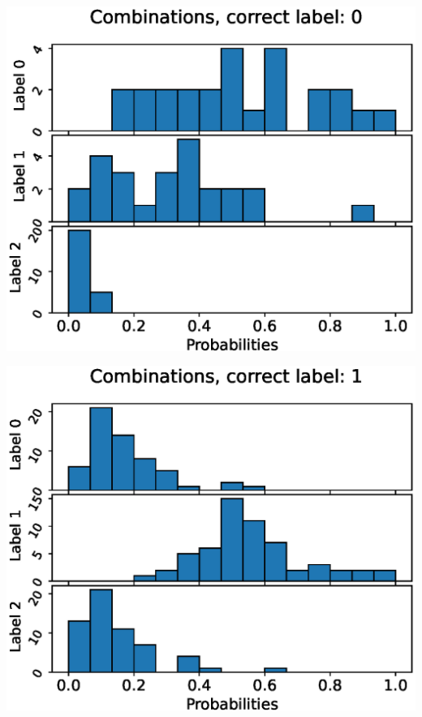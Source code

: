 \begin{center}
\begin{minipage}{0.33\textwidth}
  \includegraphics[width=\textwidth]{files/figs/app/hists/trunk/c0.eps}
\end{minipage}%
\begin{minipage}{0.33\textwidth}
  \includegraphics[width=\textwidth]{files/figs/app/hists/trunk/c1.eps}
\end{minipage}%
\begin{minipage}{0.33\textwidth}

\end{minipage}
\end{center}
